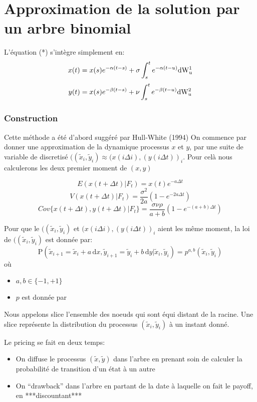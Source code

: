 \documentclass[paper=a4, fontsize=11pt]{scrartcl}
\numberwithin{equation}{section}		%
\numberwithin{figure}{section}			%
\numberwithin{table}{section}				%
\theoremstyle{definition}
\begin{document}
\newpage
\section{Approximation de la solution par un arbre binomial}


L'équation (*) s'intègre simplement en:
$$x(t) = x(s) e^{-\alpha (t-s)} +  \sigma \int_s^t e^{- \alpha (t-u)} \rm{d} W^1_u $$
$$y(t) = x(s) e^{-\beta (t-s)} +  \nu \int_s^t e^{- \beta (t-u)} \rm{d} W^2_u $$

\subsubsection{Construction}
Cette méthode a été d'abord suggéré par Hull-White (1994)
On commence par donner une approximation de la dynamique processus $x$ et $y$, par une suite de variable de discretisé $((\widetilde{x}_i, \widetilde{y}_i) \approx (x(i \Delta i), (y(i \Delta t))_i $. Pour celà nous calculerons les deux premier moment de $(x, y)$

$$E(x(t+\Delta t) | F_t) = x(t) e^{-a \Delta t}$$
$$V(x(t+\Delta t) | F_t) = \frac{\sigma^2}{2a} (1 - e^{-2a \Delta t})$$
$$Cov\{x(t+\Delta t), y(t+\Delta t) | F_t \} = \frac{\sigma \nu \rho}{a + b} (1-e^{-(a+b)\Delta t})$$

Pour que le $((\widetilde{x}_i, \widetilde{y}_i)$ et $(x(i \Delta i), (y(i \Delta t))_i $ aient les même moment, la loi de  $((\widetilde{x}_i, \widetilde{y}_i)$  est donnée par:
$$\mathrm{P} \left( \widetilde{x}_{i+1} = \widetilde{x}_i + a \, \mathrm{d}x, \widetilde{y}_{i+1} = \widetilde{y}_i + b \, \mathrm{d}y |  \widetilde{x}_i, \widetilde{y}_i \right) = p^{a, b}( \widetilde{x}_i, \widetilde{y}_i)$$
où 
\begin{itemize}
\item $a, b \in \{-1, +1\}$
\item $p$ est donnée par
\end{itemize}

Nous appelons slice l'ensemble des noeuds qui sont équi distant de la racine. Une slice représente la distribution du processus $( \widetilde{x}_i, \widetilde{y}_i)$ à un instant donné.

Le pricing se fait en deux temps:
\begin{itemize}
\item On diffuse le processus $(\widetilde{x}, \widetilde{y})$ dans l'arbre en prenant soin de calculer la probabilité de transition d'un état à un autre
\item On ``drawback'' dans l'arbre en partant de la date à laquelle on fait le payoff, en ***discountant***
\end{itemize}
\end{document}
